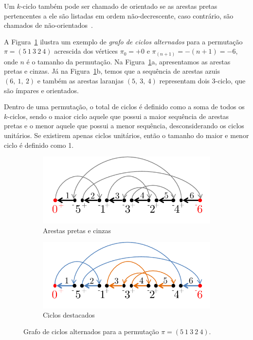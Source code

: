 \documentclass[runningheads,a4paper]{llncs}
\begin{document}
Um $k$-ciclo também pode ser chamado de orientado se as arestas pretas pertencentes a ele são listadas em ordem não-decrescente, caso contrário, são chamados de não-orientados~\cite{daSilva,Hannenhalli}.

A Figura~\ref{fig:ciclos} ilustra um exemplo de \textit{grafo de ciclos alternados} para a permutação $\pi=(5 \ 1 \ 3 \ 2 \ 4)$ acrescida dos vértices $\pi_0=+0$ e $\pi_{(n+1)}= -(n+1)=-6$, onde $n$ é o tamanho da permutação. Na Figura~\ref{fig:ciclos}a, apresentamos as arestas pretas e cinzas. Já na Figura~\ref{fig:ciclos}b, temos que a sequência de arestas azuis $(6, \ 1, \ 2)$ e também as arestas laranjas $(5, \ 3, \ 4)$ representam dois $3$-ciclo, que são ímpares e orientados.

Dentro de uma permutação, o total de ciclos é definido como a soma de todos os $k$-ciclos, sendo o maior ciclo aquele que possui a maior sequência de arestas pretas e o menor aquele que possui a menor sequência, desconsiderando os ciclos unitários. Se existirem apenas ciclos unitários, então o tamanho do maior e menor ciclo é definido como 1.

\begin{figure}[H]
	\centering
	\begin{subfigure}[b]{.4\linewidth}
		\includegraphics[width=\linewidth]{imagem-ciclo.pdf}
		\caption{Arestas pretas e cinzas}
	\end{subfigure}
	\begin{subfigure}[b]{.4\linewidth}
		\includegraphics[width=\linewidth]{imagem-ciclo-destacado.pdf}
		\caption{Ciclos destacados}
	\end{subfigure}
	\caption{Grafo de ciclos alternados para a permutação $\pi=(5 \ 1 \ 3 \ 2 \ 4)$.}
	\label{fig:ciclos}
\end{figure}
\end{document}
